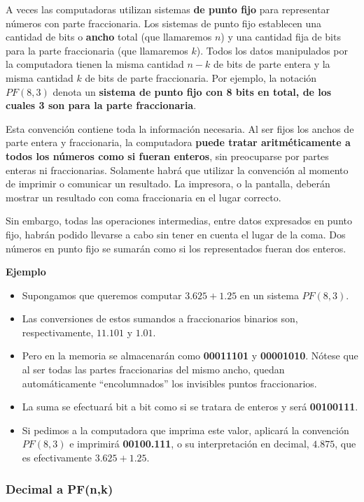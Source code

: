 \documentclass[spanish,A4,]{article}
\begin{document}
A veces las computadoras utilizan sistemas \textbf{de punto fijo} para
representar números con parte fraccionaria. Los sistemas de punto fijo
establecen una cantidad de bits o \textbf{ancho} total (que llamaremos
$n$) y una cantidad fija de bits para la parte fraccionaria (que
llamaremos $k$). Todos los datos manipulados por la computadora tienen
la misma cantidad $n-k$ de bits de parte entera y la misma cantidad $k$
de bits de parte fraccionaria. Por ejemplo, la notación $PF(8,3)$ denota
un \textbf{sistema de punto fijo con 8 bits en total, de los cuales 3
son para la parte fraccionaria}.

Esta convención contiene toda la información necesaria. Al ser fijos los
anchos de parte entera y fraccionaria, la computadora \textbf{puede
tratar aritméticamente a todos los números como si fueran enteros}, sin
preocuparse por partes enteras ni fraccionarias. Solamente habrá que
utilizar la convención al momento de imprimir o comunicar un resultado.
La impresora, o la pantalla, deberán mostrar un resultado con coma
fraccionaria en el lugar correcto.

Sin embargo, todas las operaciones intermedias, entre datos expresados
en punto fijo, habrán podido llevarse a cabo sin tener en cuenta el
lugar de la coma. Dos números en punto fijo se sumarán como si los
representados fueran dos enteros.

\textbf{Ejemplo}

\begin{itemize}
\itemsep1pt\parskip0pt
\item
  Supongamos que queremos computar $3.625 + 1.25$ en un sistema
  $PF(8,3)$.
\item
  Las conversiones de estos sumandos a fraccionarios binarios son,
  respectivamente, $11.101$ y $1.01$.
\item
  Pero en la memoria se almacenarán como \textbf{00011101} y
  \textbf{00001010}. Nótese que al ser todas las partes fraccionarias
  del mismo ancho, quedan automáticamente ``encolumnados'' los
  invisibles puntos fraccionarios.
\item
  La suma se efectuará bit a bit como si se tratara de enteros y será
  \textbf{00100111}.
\item
  Si pedimos a la computadora que imprima este valor, aplicará la
  convención $PF(8,3)$ e imprimirá \textbf{00100.111}, o su
  interpretación en decimal, $4.875$, que es efectivamente
  $3.625 + 1.25$.
\end{itemize}

\subsubsection{Decimal a PF(n,k)}\label{decimal-a-pfnk}
\end{document}
